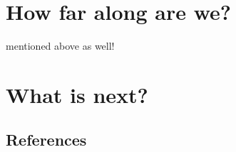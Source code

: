 \documentclass[a4paper, 11pt]{article}
\begin{document}
\section{How far along are we?}
  mentioned above as well!

\section{What is next?}

\subsection*{References}
\end{document}
